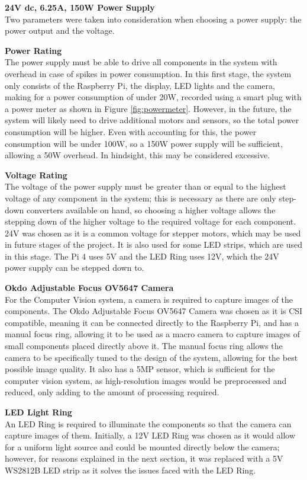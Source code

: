 \vspace{1em}
\noindent
\textbf{24V dc, 6.25A, 150W Power Supply} \\
Two parameters were taken into consideration when choosing a power supply: the power output and the voltage.
\begin{mylist}
  \item \textbf{Power Rating} \\
  The power supply must be able to drive all components in the system with overhead in case of spikes in power consumption.
  In this first stage, the system only consists of the Raspberry Pi, the display, LED lights and the camera, 
  making for a power consumption of under 20W, recorded using a smart plug with a power meter as shown in Figure \ref{fig:powermeter}.
  However, in the future, the system will likely need to drive additional motors and sensors, so the total power consumption
  will be higher. Even with accounting for this, the power consumption will be under 100W, so a 150W power supply will be sufficient,
  allowing a 50W overhead. In hindsight, this may be considered excessive.
  \item \textbf{Voltage Rating} \\
  The voltage of the power supply must be greater than or equal to the highest voltage of any component in the system; this is necessary
  as there are only step-down converters available on hand, so choosing a higher voltage allows the stepping down of the higher voltage 
  to the required voltage for each component. 24V was chosen as it is a common voltage for stepper motors, which may be used in
  future stages of the project. It is also used for some LED strips, which are used in this stage. The Pi 4 uses 5V and the LED Ring
  uses 12V, which the 24V power supply can be stepped down to.
\end{mylist}

\noindent
\textbf{Okdo Adjustable Focus OV5647 Camera} \\
For the Computer Vision system, a camera is required to capture images of the components. The Okdo Adjustable Focus OV5647 Camera
was chosen as it is CSI compatible, meaning it can be connected directly to the Raspberry Pi, and has a manual focus ring, allowing
it to be used as a macro camera to capture images of small components placed directly above it. The manual focus ring allows the camera
to be specifically tuned to the design of the system, allowing for the best possible image quality. It also
has a 5MP sensor\cite{okdospec}, which is sufficient for the computer vision system, as high-resolution images would be preprocessed and reduced,
only adding to the amount of processing required.

\vspace{1em}
\noindent
\textbf{LED Light Ring} \\
An LED Ring is required to illuminate the components so that the camera can capture images of them.
Initially, a 12V LED Ring was chosen as it would allow for a uniform light source and could be mounted directly below the camera; 
however, for reasons explained in the next section, it was replaced with a 5V WS2812B LED strip as it solves the issues
faced with the LED Ring.
